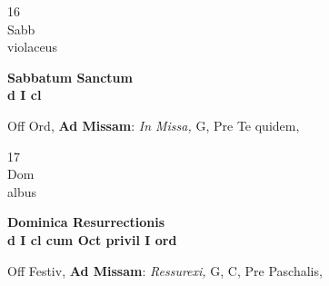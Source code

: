 \documentclass[10pt, openany]{book}
\begin{document}
        \begin{center}
            \begin{minipage}{3.5in}
                \vspace{2em}
                \begin{minipage}{0.5in}
                    {\Huge 16} \\
                    {\normalsize Sabb} \\
                    {\normalsize violaceus}
                \end{minipage}
                \begin{minipage}{3.0in}
                    \textbf{ \large Sabbatum Sanctum \\
                    \textnormal{\normalsize d I cl}} \\ 
                \end{minipage}
                \begin{justify}Off Ord, \textbf{Ad Missam}: \textit{In Missa,} G, Pre Te quidem,  
                \end{justify}
            \end{minipage}
        \end{center}
    
        \begin{center}
            \begin{minipage}{3.5in}
                \vspace{2em}
                \begin{minipage}{0.5in}
                    {\Huge 17} \\
                    {\normalsize Dom} \\
                    {\normalsize albus}
                \end{minipage}
                \begin{minipage}{3.0in}
                    \textbf{ \large Dominica Resurrectionis \\
                    \textnormal{\normalsize d I cl cum Oct privil I ord}} \\ 
                \end{minipage}
                \begin{justify}Off Festiv, \textbf{Ad Missam}: \textit{Ressurexi,} G, C, Pre Paschalis,  
                \end{justify}
            \end{minipage}
        \end{center}
    
\end{document}
